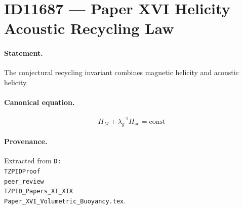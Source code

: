 \section*{ID11687 --- Paper XVI Helicity Acoustic Recycling Law}

\paragraph{Statement.}
The conjectural recycling invariant combines magnetic helicity and acoustic helicity.

\paragraph{Canonical equation.}
\[
H_M+\lambda_g^{-1}H_{\mathrm{ac}}=\mathrm{const}
\]

\paragraph{Provenance.}
Extracted from \texttt{D:\\TZPIDProof\\peer\_review\\TZPID\_Papers\_XI\_XIX\\Paper\_XVI\_Volumetric\_Buoyancy.tex}.
